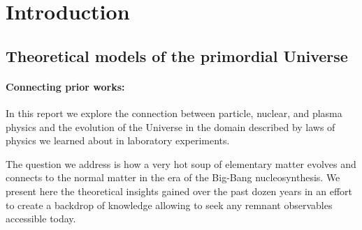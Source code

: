 \section{Introduction}
\subsection{Theoretical models of the primordial Universe}\label{ssec:UniLab}
\paragraph{Connecting prior works:}
In this report we explore the connection between particle, nuclear, and plasma physics and the evolution of the Universe in the domain described by laws of physics we learned about in laboratory experiments.

The question we address is how a very hot soup of elementary matter evolves and connects to the normal matter in the era of the Big-Bang nucleosynthesis. We present here the theoretical insights gained over the past dozen years in an effort to create a backdrop of knowledge allowing to seek any remnant observables accessible today.

